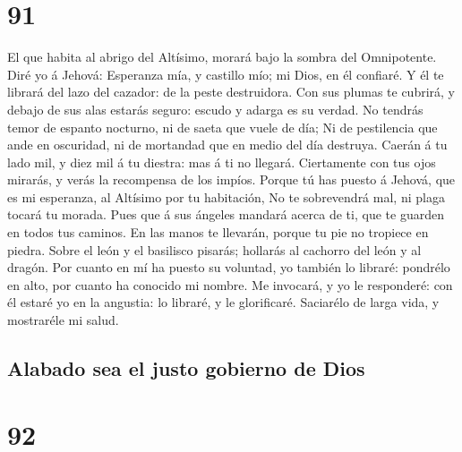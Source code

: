 \hypertarget{section-90}{%
\section{91}\label{section-90}}

 El que habita al abrigo del Altísimo, morará bajo la
sombra del Omnipotente.  Diré yo á Jehová: Esperanza mía,
y castillo mío; mi Dios, en él confiaré.  Y él te librará
del lazo del cazador: de la peste destruidora.  Con sus
plumas te cubrirá, y debajo de sus alas estarás seguro: escudo y adarga
es su verdad.  No tendrás temor de espanto nocturno, ni de
saeta que vuele de día;  Ni de pestilencia que ande en
oscuridad, ni de mortandad que en medio del día destruya. 
Caerán á tu lado mil, y diez mil á tu diestra: mas á ti no llegará.
 Ciertamente con tus ojos mirarás, y verás la recompensa
de los impíos.  Porque tú has puesto á Jehová, que es mi
esperanza, al Altísimo por tu habitación,  No te
sobrevendrá mal, ni plaga tocará tu morada.  Pues que á
sus ángeles mandará acerca de ti, que te guarden en todos tus caminos.
 En las manos te llevarán, porque tu pie no tropiece en
piedra.  Sobre el león y el basilisco pisarás; hollarás
al cachorro del león y al dragón.  Por cuanto en mí ha
puesto su voluntad, yo también lo libraré: pondrélo en alto, por cuanto
ha conocido mi nombre.  Me invocará, y yo le responderé:
con él estaré yo en la angustia: lo libraré, y le glorificaré.
 Saciarélo de larga vida, y mostraréle mi salud.

\hypertarget{alabado-sea-el-justo-gobierno-de-dios}{%
\subsection{Alabado sea el justo gobierno de
Dios}\label{alabado-sea-el-justo-gobierno-de-dios}}

\hypertarget{section-91}{%
\section{92}\label{section-91}}


